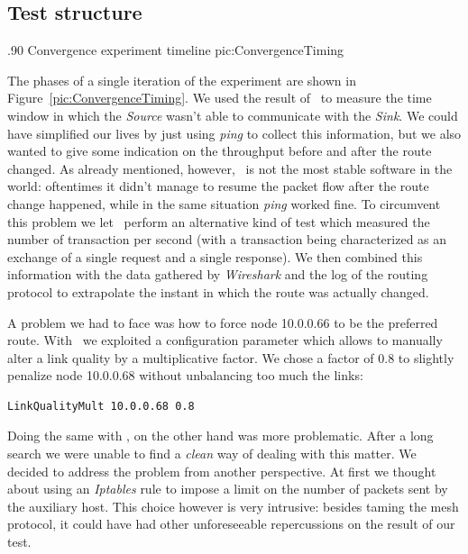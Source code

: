\subsection{Test structure}

        {.90\columnwidth}
        {Convergence experiment timeline}
        {pic:ConvergenceTiming}


    The phases of a single iteration of the experiment are shown in
    Figure~\ref{pic:ConvergenceTiming}.  We used the result of \netperf\
    to measure the time window in which the \emph{Source} wasn't able to
    communicate with the \emph{Sink}. We could have simplified our lives
    by just using \emph{ping} to collect this information, but we also
    wanted to give some indication on the throughput before and after the
    route changed. As already mentioned, however, \netperf\ is not the
    most stable software in the world: oftentimes it didn't manage to
    resume the packet flow after the route change happened, while in the
    same situation \emph{ping} worked fine. To circumvent this problem we
    let \netperf\ perform an alternative kind of test which measured the
    number of transaction per second (with a transaction being
    characterized as an exchange of a single request and a single
    response).  We then combined this information with the data gathered
    by \emph{Wireshark} and the log of the routing protocol to extrapolate
    the instant in which the route was actually changed.

    A problem we had to face was how to force node 10.0.0.66 to be the
    preferred route. With \olsr\ we exploited a configuration parameter
    which allows to manually alter a link quality by a multiplicative
    factor. We chose a factor of $0.8$ to slightly penalize node 10.0.0.68
    without unbalancing too much the links:

\begin{verbatim}
LinkQualityMult 10.0.0.68 0.8
\end{verbatim}

    Doing the same with \batman, on the other hand was more problematic.
    After a long search we were unable to find a \emph{clean} way of
    dealing with this matter. We decided to address the problem from
    another perspective.  At first we thought about using an
    \emph{Iptables} rule to impose a limit on the number of packets sent
    by the auxiliary host. This choice however is very intrusive: besides
    taming the mesh protocol, it could have had other unforeseeable
    repercussions on the result of our test.


